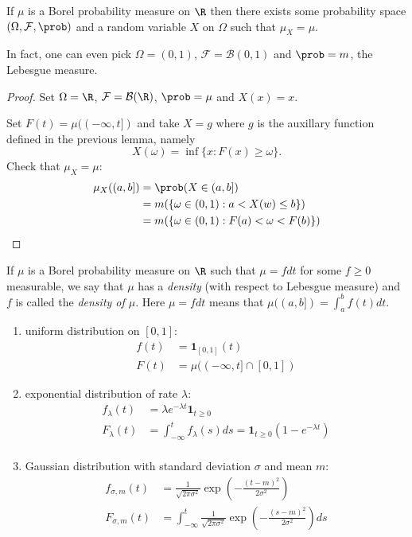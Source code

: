 \documentclass[a4paper]{article}
\renewcommand{\P}{\prob} %
\begin{document}
\begin{proposition}
  If \(\mu\) is a Borel probability measure on \(\R\) then there exists some probability space \((\Omega, \mathcal F, \P)\) and a random variable \(X\) on \(\Omega\) such that \(\mu_X = \mu\).

  In fact, one can even pick \(\Omega = (0, 1)\), \(\mathcal F = \mathcal B(0, 1)\) and \(\P = m\), the Lebesgue measure.
\end{proposition}

\begin{proof}
  Set \(\Omega = \R\), \(\mathcal F = \mathcal B(\R)\), \(\P = \mu\) and \(X(x) = x\).

  Set \(F(t) = \mu((-\infty, t])\) and take \(X = g\) where \(g\) is the auxillary function defined in the previous lemma, namely
  \[
    X(\omega) = \inf\{x: F(x) \geq \omega\}.
  \]
  Check that \(\mu_X = \mu\):
  \begin{align*}
    \mu_X((a, b])
    &= \P(X \in (a, b]) \\
    &= m(\{\omega \in (0, 1): a < X(w) \leq b\}) \\
    &= m(\{\omega \in (0, 1): F(a) < \omega < F(b)\})
  \end{align*}
\end{proof}

\begin{remark}
  If \(\mu\) is a Borel probability measure on \(\R\) such that \(\mu = f dt\) for some \(f \geq 0\) measurable, we say that \(\mu\) has a \emph{density} (with respect to Lebesgue measure) and \(f\) is called the \emph{density of \(\mu\)}. Here \(\mu = f dt\) means that \(\mu((a, b]) = \int_a^b f(t) dt\).
\end{remark}

\begin{eg}\leavevmode
  \begin{enumerate}
  \item uniform distribution on \([0, 1]\):
    \begin{align*}
      f(t) &= \mathbf 1_{[0, 1]}(t) \\
      F(t) &= \mu((-\infty, t] \cap [0, 1])
    \end{align*}
  \item exponential distribution of rate \(\lambda\):
    \begin{align*}
      f_\lambda(t) &= \lambda e^{-\lambda t} \mathbf 1_{t \geq 0} \\
      F_\lambda(t) &= \int_{-\infty}^t f_\lambda(s) ds = \mathbf 1_{t \geq 0} (1 - e^{-\lambda t}) \\
      \end{align*}
    \item Gaussian distribution with standard deviation \(\sigma\) and mean \(m\):
      \begin{align*}
        f_{\sigma, m}(t) &= \frac{1}{\sqrt{2\pi \sigma^2}} \exp(- \frac{(t - m)^2}{2\sigma^2}) \\
        F_{\sigma, m}(t) & = \int_{-\infty}^t \frac{1}{\sqrt{2\pi \sigma^2}} \exp (- \frac{(s - m)^2}{2\sigma^2}) ds
      \end{align*}
  \end{enumerate}
\end{eg}
\end{document}
